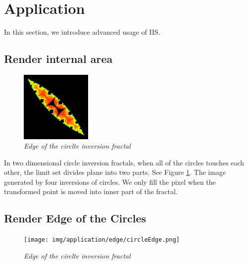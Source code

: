 

\section{Application}

In this section, we introduce advanced usage of IIS.

\subsection{Render internal area}

\begin{figure}[htbp]
  \center
  \includegraphics[height=1.35in, keepaspectratio]{img/application/internal/schottky.png}
  \caption{\textit{Edge of the circlte inversion fractal}}
   \label{fig:divideTwo}
 \hspace*{\fill}
\end{figure}

In two dimensional circle inversion fractals,
when all of the circles touches each other, the limit set divides plane
into two parts. See Figure \ref{fig:divideTwo}. %
The image generated by four inversions of circles.
We only fill the pixel when the transformed point is moved into
inner part of the fractal.

\subsection{Render Edge of the Circles}

\begin{figure}[htbp]
  \center
  \texttt{[image: img/application/edge/circleEdge.png]}
  \caption{\textit{Edge of the circlte inversion fractal}}
  \label{fig:circleEdge}
 \hspace*{\fill}
\end{figure}

